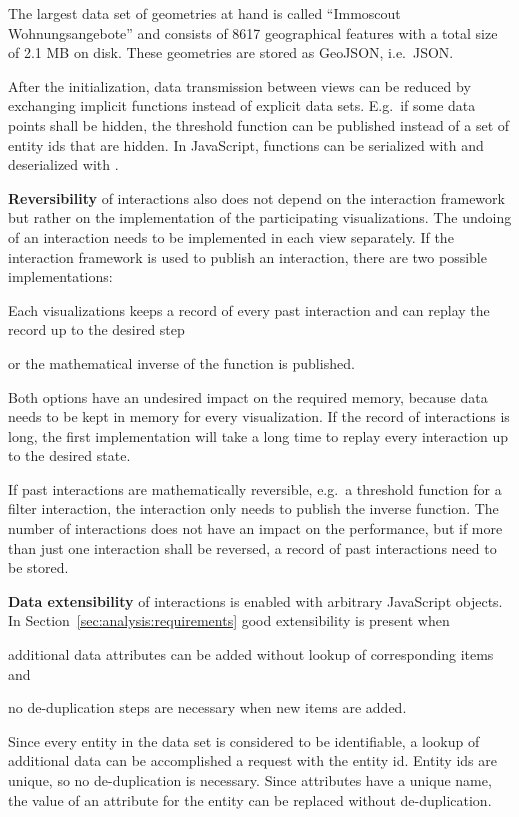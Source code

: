 The largest data set of geometries at hand is called ``Immoscout Wohnungsangebote'' and consists of 8617 geographical features with a total size of 2.1 MB on disk.
These geometries are stored as GeoJSON, i.e.\ JSON.

After the initialization, data transmission between views can be reduced by exchanging implicit functions instead of explicit data sets.
E.g.\ if some data points shall be hidden, the threshold function can be published instead of a set of entity ids that are hidden.
In JavaScript, functions can be serialized with  and deserialized with .


\textbf{Reversibility} of interactions also does not depend on the interaction framework but rather on the implementation of the participating visualizations.
The undoing of an interaction needs to be implemented in each view separately.
If the interaction framework is used to publish an  interaction, there are two possible implementations:
\begin{enumerate*}[label=(\arabic*)]
  \item
    Each visualizations keeps a record of every past interaction and can replay the record up to the desired step
    \item
    or the mathematical inverse of the function is published.
\end{enumerate*}
Both options have an undesired impact on the required memory, because data needs to be kept in memory for every visualization.
If the record of interactions is long, the first implementation will take a long time to replay every interaction up to the desired state.

If past interactions are mathematically reversible, e.g.\ a threshold function for a filter interaction, the  interaction only needs to publish the inverse function.
The number of interactions does not have an impact on the performance, but if more than just one interaction shall be reversed, a record of past interactions need to be stored.

\textbf{Data extensibility} of interactions is enabled with arbitrary JavaScript objects.
In Section~\ref{sec:analysis:requirements} good extensibility is present when
\begin{enumerate*}[label=(\arabic*)]
  \item
    additional data attributes can be added without lookup of corresponding items and
  \item
    no de-duplication steps are necessary when new items are added.
\end{enumerate*}
Since every entity in the data set is considered to be identifiable, a lookup of additional data can be accomplished a request with the entity id.
Entity ids are unique, so no de-duplication is necessary.
Since attributes have a unique name, the value of an attribute for the entity can be replaced without de-duplication.

